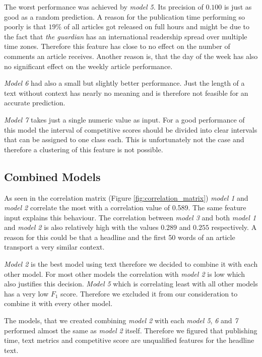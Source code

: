 The worst performance was achieved by \textit{model 5}. Its precision of $0.100$ is just as good as a random prediction. A reason for the publication time performing so poorly is that $19\%$ of all articles got released on full hours and might be due to the fact that \textit{the guardian} has an international readership spread over multiple time zones. Therefore this feature has close to no effect on the number of comments an article receives. Another reason is, that the day of the week has also no significant effect on the weekly article performance.

\textit{Model 6} had also a small but slightly better performance. Just the length of a text without context has nearly no meaning and is therefore not feasible for an accurate prediction.

\textit{Model 7} takes just a single numeric value as input. For a good performance of this model the interval of competitive scores should be divided into clear intervals that can be assigned to one class each. This is unfortunately not the case and therefore a clustering of this feature is not possible.



\subsection{Combined Models}
As seen in the correlation matrix (Figure \ref{fig:correlation_matrix}) \textit{model 1} and \textit{model 2} correlate the most with a correlation value of 0.589. The same feature input explains this behaviour. The correlation between \textit{model 3} and both \textit{model 1} and \textit{model 2} is also relatively high with the values $0.289$ and $0.255$ respectively. A reason for this could be that a headline and the first 50 words of an article transport a very similar context.

\textit{Model 2} is the best model using text therefore we decided to combine it with each other model. For most other models the correlation with \textit{model 2} is low which also justifies this decision.
\textit{Model 5} which is correlating least with all other models has a very low $F_1$ score. Therefore we excluded it from our consideration to combine it with every other model.

The models, that we created combining \textit{model 2} with each \textit{model 5}, \textit{6} and \textit{7} performed almost the same as \textit{model 2} itself. Therefore we figured that publishing time, text metrics and competitive score are unqualified features for the headline text.

